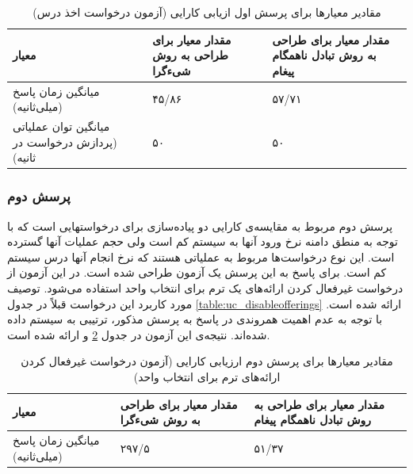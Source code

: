 
\begin{table}[ht]
\small
\begin{center}
\begin{tabular}{|p{7cm}|p{4cm}|p{4cm}|}
	\hline
\textbf{معیار} & \textbf{مقدار معیار برای طراحی به روش شیءگرا} & \textbf{مقدار معیار برای طراحی به روش تبادل ناهمگام پیغام} 
\\ 
	\hline
	میانگین زمان پاسخ (میلی‌ثانیه)
	 &
	 ۴۵/۸۶
	 &
     ۵۷/۷۱ 
\\
	\hline
	میانگین توان عملیاتی (پردازش درخواست در ثانیه)
	 &
	 ۵۰
	 &
	 ۵۰
\\
	\hline
\end{tabular}
\caption{\label{table:perf_result_1_2} مقادیر معیارها برای پرسش اول ازیابی کارایی (آزمون درخواست اخذ درس)}
\end{center}
\end{table}





\subsubsection{پرسش دوم}
پرسش دوم مربوط به مقایسه‌ی کارایی دو پیاده‌سازی برای درخواستهایی است که با توجه به منطق دامنه نرخ ورود آنها به سیستم کم است ولی حجم عملیات آنها گسترده است. این نوع درخواست‌ها مربوط به عملیاتی هستند که نرخ انجام آنها درس سیستم کم است. برای پاسخ به این پرسش یک آزمون طراحی شده است. در این آزمون از درخواست غیرفعال کردن ارائه‌های یک ترم برای انتخاب واحد استفاده می‌شود. توصیف مورد کاربرد این درخواست قبلاً در جدول \ref{table:uc_disableofferings} ارائه شده است. با توجه به عدم اهمیت همروندی در پاسخ به پرسش مذکور، ترتیبی به سیستم داده شده‌اند. نتیجه‌ی این آزمون در جدول \ref{table:perf_result_2} و ارائه شده است. 





\begin{table}[ht]
\small
\begin{center}
\begin{tabular}{|p{7cm}|p{4cm}|p{4cm}|}
	\hline
\textbf{معیار} & \textbf{مقدار معیار برای طراحی به روش شیءگرا} & \textbf{مقدار معیار برای طراحی به روش تبادل ناهمگام پیغام} 
\\ 
	\hline
	میانگین زمان پاسخ (میلی‌ثانیه)
	 &
	 ۲۹۷/۵
	 &
 ۵۱/۳۷ 
\\
	\hline
\end{tabular}
\caption{\label{table:perf_result_2} مقادیر معیارها برای پرسش دوم ارزیابی کارایی (آزمون درخواست غیرفعال کردن ارائه‌های ترم برای انتخاب واحد)}
\end{center}
\end{table}


